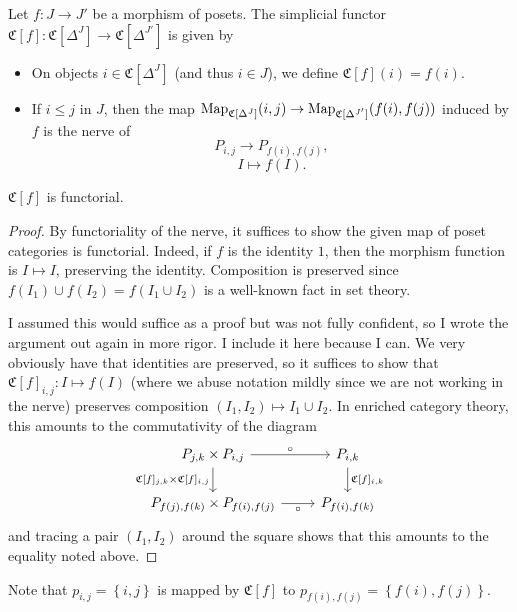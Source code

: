 \begin{definition}\label{1.1.5.2}
	Let $f : J \to J'$ be a morphism of posets. The simplicial functor $\mathfrak{C} [f]: \mathfrak{C} [\Delta ^J] \to \mathfrak{C} [\Delta ^{J'} ]$ is given by
	\begin{itemize}
		\item On objects $i\in \mathfrak{C} [\Delta ^J]$ (and thus $i\in J$), we define $\mathfrak{C} [f](i)=f(i)$.
		\item If $i\leq j$ in $J$, then the map $\operatorname{Map}_{\mathfrak{C} [\Delta ^J]} (i,j)\to \operatorname{Map}_{\mathfrak{C} [\Delta ^{J'} ]} (f(i),f(j))$ induced by $f$ is the nerve of
			\[
				P_{i,j} \to P_{f(i),f(j)} ,
			\]
			\[
				I\mapsto f(I)
			.\]
	\end{itemize}
\end{definition}
\begin{claim}\label{1.1.5.3}
	$\mathfrak{C} [f]$ is functorial.
\end{claim}
\begin{proof}
	By functoriality of the nerve, it suffices to show the given map of poset categories is functorial. Indeed, if $f$ is the identity $1$, then the morphism function is $I\mapsto I$, preserving the identity. Composition is preserved since $f(I_1) \cup f(I_2)=f(I_1 \cup I_2)$ is a well-known fact in set theory.

	I assumed this would suffice as a proof but was not fully confident, so I wrote the argument out again in more rigor. I include it here because I can. We very obviously have that identities are preserved, so it suffices to show that $\mathfrak{C} [f]_{i,j} : I\mapsto f(I)$ (where we abuse notation mildly since we are not working in the nerve) preserves composition $(I_1,I_2)\mapsto I_1\cup I_2$. In enriched category theory, this amounts to the commutativity of the diagram
\[\begin{tikzcd}
    {P_{j,k}\times P_{i,j}} & {P_{i,k}} \\
    {P_{f(j),f(k)}\times P_{f(i),f(j)}} & {P_{f(i),f(k)}}
    \arrow["\circ", from=1-1, to=1-2]
    \arrow["{\mathfrak{C}[f]_{j,k}\times\mathfrak{C}[f]_{i,j}}"', from=1-1, to=2-1]
    \arrow["{\mathfrak{C}[f]_{i,k}}", from=1-2, to=2-2]
    \arrow["\circ"', from=2-1, to=2-2]
\end{tikzcd}\]
	and tracing a pair $(I_1,I_2)$ around the square shows that this amounts to the equality noted above.
\end{proof}
\begin{remark}\label{1.1.5.4}
	Note that $p_{i,j} =\left\{ i,j \right\} $ is mapped by $\mathfrak{C} [f]$ to $p_{f(i),f(j)} =\left\{ f(i),f(j) \right\} $.
\end{remark}


